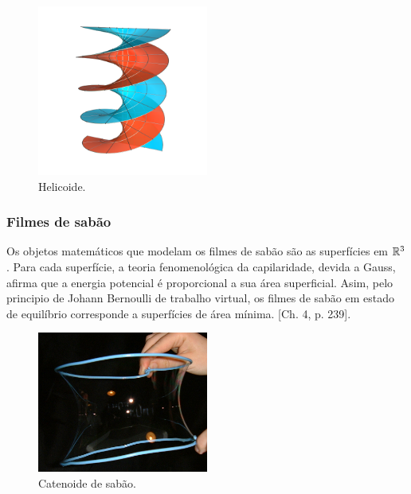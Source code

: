 \documentclass[12pt,a4paper]{beamer}
\theoremstyle{definition}
\begin{document}
\begin{frame}[allowframebreaks]
	\begin{figure}
		\centering
		\includegraphics[width=0.5\textwidth]{images/helicoid}
		\caption{Helicoide.}
	\end{figure}
\end{frame}

\begin{frame}[allowframebreaks]
	\frametitle{Filmes de sabão}
	
	Os objetos matemáticos que modelam os filmes de sabão são as superfícies em $\mathbb R^3$. Para cada superfície, a teoria fenomenológica da capilaridade, devida a Gauss, afirma que a energia potencial é proporcional a sua área superficial. Asim, pelo principio de Johann Bernoulli de trabalho virtual, os filmes de sabão em estado de equilíbrio corresponde a superfícies de área mínima. \cite{Dierkes2010}[Ch. 4, p. 239].
	
	\begin{figure}
		\centering
		\includegraphics[width=0.5\textwidth]{images/soap-catenoid}
		\caption{Catenoide de sabão.}
	\end{figure}
	
\end{frame}
\end{document}
